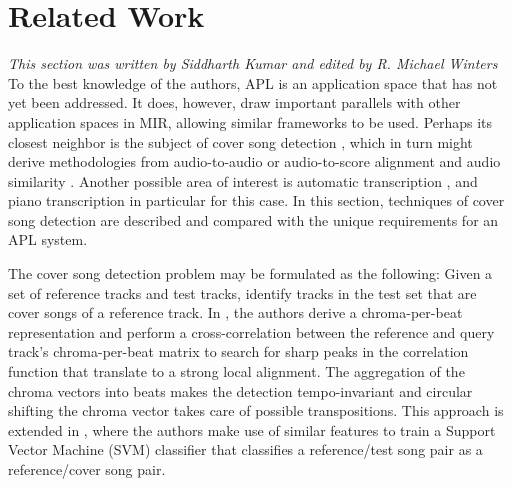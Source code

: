 \documentclass{article}
\begin{document}

\section{Related Work}

\textit{This section was written by Siddharth Kumar and edited by R. Michael Winters}
To the best knowledge of the authors, APL is an application space that has not yet been addressed. It does, however, draw important parallels with other application spaces in MIR, allowing similar frameworks to be used.  Perhaps its closest neighbor is the subject of cover song detection \cite{Ellis2007Cover,serra2008chroma,bertin2011large}, which in turn might derive methodologies from audio-to-audio or audio-to-score alignment and audio similarity \cite{hu2003polyphonic}.  Another possible area of interest is automatic transcription \cite{klapuri2004automatic}, and piano transcription \cite{raphael2002automatic} in particular for this case. In this section, techniques of cover song detection are described and compared with the unique requirements for an APL system. 


The cover song detection problem may be formulated as the following: Given a set of reference tracks and test tracks, identify tracks in the test set that are cover songs of a reference track. 
%
In \cite{Ellis2007Cover}, the authors derive a chroma-per-beat representation and perform a cross-correlation between the reference and query track's chroma-per-beat matrix to search for sharp peaks in the correlation function that translate to a strong local alignment.
The aggregation of the chroma vectors into beats makes the detection tempo-invariant and circular shifting the chroma vector takes care of possible transpositions. This approach is extended in \cite{ravuri2010cover}, where the authors make use of similar features to train a Support Vector Machine (SVM) classifier that classifies a reference/test song pair as a reference/cover song pair.  
%
\end{document}
